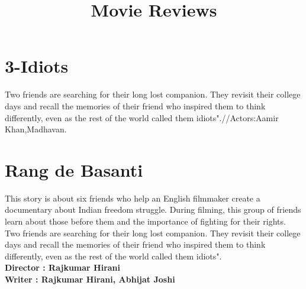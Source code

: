 \documentclass{article}
\title{Movie Reviews}
\begin{document}
	\maketitle
	\section{3-Idiots}
	\large{Two friends are searching for their long lost companion. They revisit their college days and recall the memories of their friend who inspired them to think differently, even as the rest of the world called them idiots".//Actors:Aamir Khan,Madhavan.}
	\section{Rang de Basanti}
	\large{This story is about six friends who help an English filmmaker create a documentary about Indian freedom struggle. During filming, this group of friends learn about those before them and the importance of fighting for their rights.}
	\large{Two friends are searching for their long lost companion. They revisit their college days and recall the memories of their friend who inspired them to think differently, even as the rest of the world called them idiots".}
\\
\textbf{Director : Rajkumar Hirani}
\\
\textbf{Writer : Rajkumar Hirani, Abhijat Joshi}
	
\end{document}
